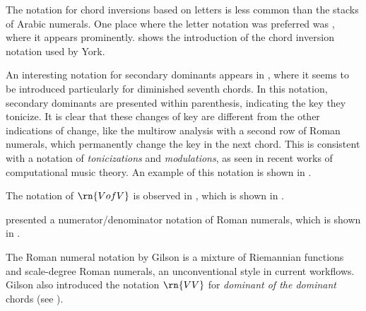 The notation for chord inversions based on letters is less
common than the stacks of Arabic numerals. One place where
the letter notation was preferred was
\textcite{york1909practical}, where it appears prominently.
 shows
the introduction of the chord inversion notation used by
York.


An interesting notation for secondary dominants appears in
\textcite{white1911harmonic}, where it seems to be
introduced particularly for diminished seventh chords. In
this notation, secondary dominants are presented within
parenthesis, indicating the key they tonicize. It is clear
that these changes of key are different from the other
indications of change, like the multirow analysis with a
second row of Roman numerals, which permanently change the
key in the next chord. This is consistent with a notation of
\emph{tonicizations} and \emph{modulations}, as seen in
recent works of computational music theory. An example of
this notation is shown in
.


The notation of $\rn{V of V}$ is observed in
\textcite{mokrejs1913lessons}, which is shown in
.


\textcite{gilson1919traite} presented a
numerator/denominator notation of Roman numerals, which is
shown in
.



The Roman numeral notation by Gilson is a mixture of
Riemannian functions and scale-degree Roman numerals, an
unconventional style in current workflows. Gilson also
introduced the notation $\rn{VV}$ for \emph{dominant of the
dominant} chords (see
).

